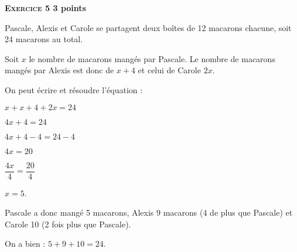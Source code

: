 \textbf{\textsc{Exercice 5} \hfill 3 points}

\medskip

Pascale, Alexis et Carole se partagent deux boîtes de 12 macarons chacune, soit 24
macarons au total.

Soit $x$ le nombre de macarons mangés par Pascale. Le nombre de macarons mangés par
Alexis est donc de $x + 4$ et celui de Carole $2x$.

On peut écrire et résoudre l'équation :

$x + x + 4 + 2x = 24$

$4x + 4 = 24$

$4 x + 4 - 4 = 24 - 4$

$4x = 20$

$\dfrac{4x}{4} = \dfrac{20}{4}$

$x = 5$.

Pascale a donc mangé 5 macarons, Alexis 9 macarons (4 de plus que Pascale) et Carole
10 (2 fois plus que Pascale).

On a bien : $5 + 9 + 10=24$.
\vspace{0,5cm}

